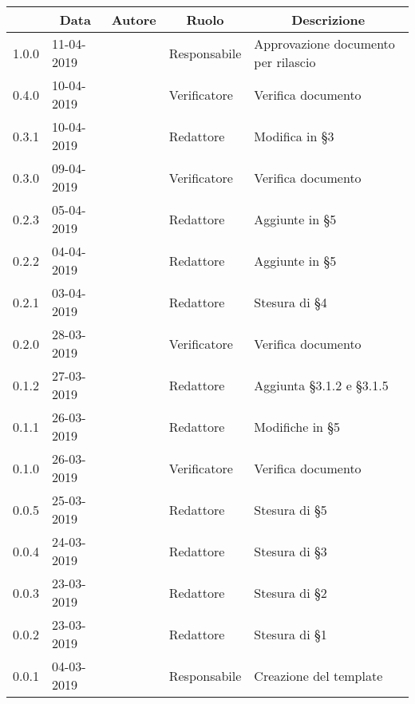\pagestyle{styleDocPages}

\begin{center} \sloppy
	\renewcommand{\arraystretch}{2.5}
	
	\begin{longtable}[H]{p{1.7cm} p{2cm} p{1.8cm} p{2.5cm} p{4cm}}
\rowcolor[HTML]{232f3e}
\multicolumn{1}{c}{\color[HTML]{FFFFFF} \textbf{Versione}} & 
\multicolumn{1}{c}{\color[HTML]{FFFFFF} \textbf{Data}} & 
\multicolumn{1}{c}{\color[HTML]{FFFFFF} \textbf{Autore}} & 
\multicolumn{1}{c}{\color[HTML]{FFFFFF} \textbf{Ruolo}} & 
\multicolumn{1}{c}{\color[HTML]{FFFFFF} \textbf{Descrizione}} \\
\endhead

1.0.0 & 11-04-2019 & \andrea{} & Responsabile & Approvazione documento per rilascio\\
0.4.0 & 10-04-2019 & \singh{} & Verificatore & Verifica documento\\
0.3.1 & 10-04-2019 & \giacomo{}{} & Redattore & Modifica in §3\\
0.3.0 & 09-04-2019 & \singh{} & Verificatore & Verifica documento\\
0.2.3 & 05-04-2019 & \valentin{} & Redattore & Aggiunte in §5\\
0.2.2 & 04-04-2019 & \valentin{} & Redattore & Aggiunte in §5\\
0.2.1 & 03-04-2019 & \davide{} & Redattore & Stesura di §4\\
0.2.0 & 28-03-2019 & \daniele{} & Verificatore & Verifica documento\\
0.1.2 & 27-03-2019 & \giacomo{} & Redattore & Aggiunta §3.1.2 e §3.1.5\\
0.1.1 & 26-03-2019 & \valentin{} & Redattore & Modifiche in §5\\
0.1.0 & 26-03-2019 & \francesco{} & Verificatore & Verifica documento\\
0.0.5 & 25-03-2019 & \valentin{} & Redattore & Stesura di §5\\
0.0.4 & 24-03-2019 & \giacomo{} & Redattore & Stesura di §3\\
0.0.3 & 23-03-2019 & \giacomo{} & Redattore & Stesura di §2\\
0.0.2 & 23-03-2019 & \davide{} & Redattore & Stesura di §1\\
0.0.1 & 04-03-2019 & \andrea{} & Responsabile & Creazione del template\\

\end{longtable}
\end{center}
